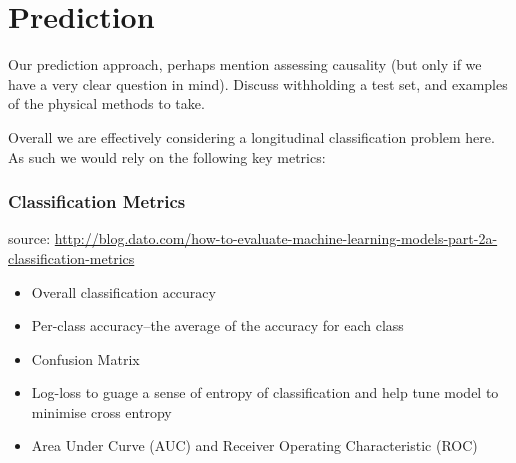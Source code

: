 \documentclass{article}
\begin{document}
%




\section{Prediction}

Our prediction approach, perhaps mention assessing causality (but only if we 
have a very clear question in mind). Discuss withholding a test set, and 
examples of the physical methods to take.

\noindent Overall we are effectively considering a longitudinal classification
problem here. As such we would rely on the following key metrics:

\subsubsection{Classification Metrics}
source: \url{http://blog.dato.com/how-to-evaluate-machine-learning-models-part-2a-classification-metrics}
\begin{itemize}
  \item  Overall classification accuracy
  \item  Per-class accuracy--the average of the accuracy for each class
  \item  Confusion Matrix
  \item  Log-loss to guage a sense of entropy of classification and help tune 
         model to minimise cross entropy
  \item  Area Under Curve (AUC) and Receiver Operating Characteristic (ROC)
\end{itemize}
\end{document}
